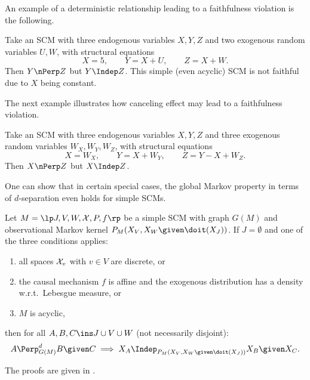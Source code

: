 An example of a deterministic relationship leading to a faithfulness violation is the following.
\begin{Eg}
  Take an SCM with three endogenous variables $X,Y,Z$ and two exogenous random variables $U,W$, with structural equations
  $$X = 5, \qquad Y = X + U, \qquad Z = X + W.$$
  Then $Y \nPerp Z$ but $Y \Indep Z$.
  This simple (even acyclic) SCM is not faithful due to $X$ being constant.
\end{Eg}
The next example illustrates how canceling effect may lead to a faithfulness violation.
\begin{Eg}
  Take an SCM with three endogenous variables $X,Y,Z$ and three exogenous random variables $W_X,W_Y,W_Z$, with structural equations
  $$X = W_X, \qquad Y = X + W_Y, \qquad Z = Y - X + W_Z.$$
  Then $X \nPerp Z$ but $X \Indep Z$.
\end{Eg}
One can show that in certain special cases, the global Markov property in terms of $d$-separation even holds for simple SCMs.
\begin{Prp}
  Let $M = \lt \Sin, \Send, \Srnd, \CX, P, f \rt$ be a simple SCM with graph $G(M)$
  and observational Markov kernel $P_{M}(X_V,X_W \given \doit(X_J))$.
  If $J = \emptyset$ and one of the three conditions applies:
  \begin{enumerate}
    \item all spaces $\mathcal{X}_v$ with $v \in V$ are discrete, or
    \item the causal mechanism $f$ is affine and the exogenous distribution has a density w.r.t.\ Lebesgue measure, or
    \item $M$ is acyclic,
  \end{enumerate} 
  then for all $A, B, C \ins J \cup V \cup W$ (not necessarily disjoint):
  $$A \Perp^d_{G(M)} B \given C \implies X_A \Indep_{P_{M}(X_V,X_W \given \doit(\XJ))} X_B \given X_C.$$
\end{Prp}
The proofs are given in \cite{FM17}.

